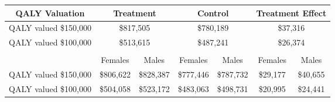 \begin{tabular}{ccccccc}
\toprule
QALY Valuation &  \multicolumn{2}{c}{Treatment}   & \multicolumn{2}{c}{Control} & \multicolumn{2}{c}{Treatment Effect}  \\ \midrule

QALY valued \$150,000 &	\multicolumn{2}{c}{\$817,505  }	& \multicolumn{2}{c}{ \$780,189  } & \multicolumn{2}{c}{\$37,316 } \\ 
QALY valued \$100,000 & \multicolumn{2}{c}{ \$513,615   } & \multicolumn{2}{c}{\$487,241 }	&	\multicolumn{2}{c}{\$26,374 } \\ \midrule
&&&&&& \\
& Females & Males & Females & Males & Females & Males \\ \hline
QALY valued \$150,000 & \$806,622 	& \$828,387 	& \$777,446 	& \$787,732 	& \$29,177 	& \$40,655  \\
QALY valued \$100,000 & \$504,058 	& \$523,172 	& \$483,063 	& \$498,731 	& \$20,995 	& \$24,441  \\ 
\bottomrule
\end{tabular}
